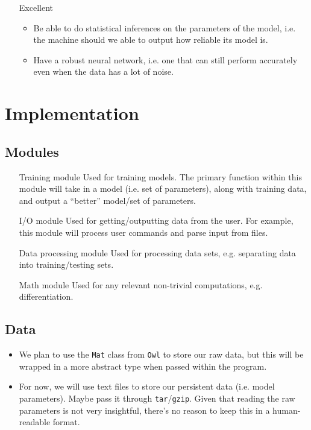 \documentclass{article}
\begin{document}
\begin{itemize}
\begin{itemize}[leftmargin=2cm]
	\item[Excellent]
		\begin{itemize}
		\item Be able to do statistical inferences on the parameters of the model, i.e. the machine should we able to output how reliable its model is.
		\item Have a robust neural network, i.e. one that can still perform accurately even when the data has a lot of noise.
		\end{itemize}
	
	\end{itemize}

\end{itemize}

\section{Implementation}

\subsection{Modules}

\begin{itemize}[leftmargin=4cm]

\item[Training module] Used for training models. The primary function within this module will take in a model (i.e. set of parameters), along with training data, and output a ``better'' model/set of parameters.

\item[I/O module] Used for getting/outputting data from the user. For example, this module will process user commands and parse input from files.

\item[Data processing module] Used for processing data sets, e.g. separating data into training/testing sets.

\item[Math module] Used for any relevant non-trivial computations, e.g. differentiation.

\end{itemize}

\subsection{Data}

\begin{itemize}

\item We plan to use the \texttt{Mat} class from \texttt{Owl} to store our raw data, but this will be wrapped in a more abstract type when passed within the program.

\item For now, we will use text files to store our persistent data (i.e. model parameters). Maybe pass it through \texttt{tar}/\texttt{gzip}. Given that reading the raw parameters is not very insightful, there's no reason to keep this in a human-readable format.

\end{itemize}
\end{document}
